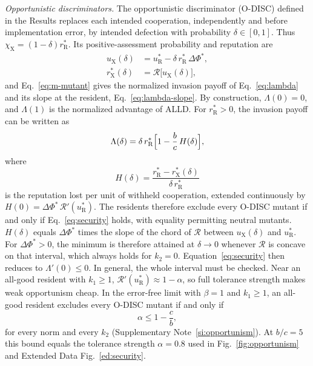 \documentclass[10pt]{wlscirep}
\newcommand{\Rmap}{\mathscr{R}}            %
\newcommand{\rR}{r_{\mathrm{R}}^{*}}
\newcommand{\uR}{u_{\mathrm{R}}^{*}}
\newcommand{\rX}{r_{\mathrm{X}}^{*}}
\newcommand{\uX}{u_{\mathrm{X}}}
\newcommand{\dPhi}{\Delta\Phi^{*}}
\theoremstyle{plain}
\theoremstyle{remark}
\begin{document}
\textit{Opportunistic discriminators.} The opportunistic discriminator (O-DISC) defined in the Results replaces each intended cooperation, independently and before implementation error, by intended defection with probability $\delta\in[0,1]$. Thus $\chi_{\mathrm X}=(1-\delta)\rR$. Its positive-assessment probability and reputation are
\begin{equation}
\begin{aligned}
\uX(\delta)&=\uR-\delta\,\rR\,\dPhi,\\
\rX(\delta)&=\Rmap\bigl[\uX(\delta)\bigr],
\end{aligned}
\label{eq:m-odisc}
\end{equation}
and Eq.~\eqref{eq:m-mutant} gives the normalized invasion payoff of Eq.~\eqref{eq:lambda} and its slope at the resident, Eq.~\eqref{eq:lambda-slope}. By construction, $\Lambda(0)=0$, and $\Lambda(1)$ is the normalized advantage of ALLD. For $\rR>0$, the invasion payoff can be written as
\begin{equation}
\Lambda(\delta)=\delta\,\rR\Bigl[1-\frac{b}{c}\,H(\delta)\Bigr],
\label{eq:m-lambda-H}
\end{equation}
where
\begin{equation}
H(\delta)=\frac{\rR-\rX(\delta)}{\delta\,\rR}
\label{eq:m-H}
\end{equation}
is the reputation lost per unit of withheld cooperation, extended continuously by $H(0)=\dPhi\,\Rmap'(\uR)$. The residents therefore exclude every O-DISC mutant if and only if Eq.~\eqref{eq:security} holds, with equality permitting neutral mutants. $H(\delta)$ equals $\dPhi$ times the slope of the chord of $\Rmap$ between $\uX(\delta)$ and $\uR$. For $\dPhi>0$, the minimum is therefore attained at $\delta\to0$ whenever $\Rmap$ is concave on that interval, which always holds for $k_2=0$. Equation~\eqref{eq:security} then reduces to $\Lambda'(0)\leq0$. In general, the whole interval must be checked. Near an all-good resident with $k_1\geq1$, $\Rmap'(\uR)\approx1-\alpha$, so full tolerance strength makes weak opportunism cheap. In the error-free limit with $\beta=1$ and $k_1\geq1$, an all-good resident excludes every O-DISC mutant if and only if
\begin{equation}
\alpha\leq1-\frac{c}{b},
\label{eq:m-errorfree}
\end{equation}
for every norm and every $k_2$ (Supplementary Note~\ref{si:opportunism}). At $b/c=5$ this bound equals the tolerance strength $\alpha=0.8$ used in Fig.~\ref{fig:opportunism} and Extended Data Fig.~\ref{ed:security}.
\end{document}
